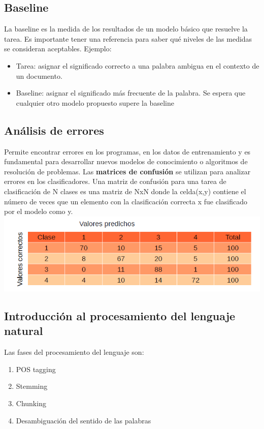 \documentclass{ctexart}
\begin{document}
	\subsection{Baseline}
	\begin{flushleft}
		La baseline es la medida de los resultados de un modelo básico que resuelve la tarea. Es importante tener una referencia para saber qué niveles de las medidas se consideran aceptables.
		Ejemplo:
		\begin{itemize}
			\item Tarea: asignar el significado correcto a una palabra ambigua en el contexto de un documento.
			\item Baseline: asignar el significado más frecuente de la palabra.	Se espera que cualquier otro modelo propuesto supere la baseline
		\end{itemize}
	\end{flushleft}
	\subsection{Análisis de errores}
	\begin{flushleft}
		Permite encontrar errores en los programas, en los datos de entrenamiento y es fundamental para desarrollar nuevos modelos de conocimiento o algoritmos de resolución de problemas.
		Las \textbf{matrices de confusión} se utilizan para analizar errores en los clasificadores. Una matriz de confusión para una tarea de clasificación de N clases es una matriz de NxN
		donde la celda(x,y) contiene el número de veces que un elemento con la clasificación correcta x fue clasificado por el modelo como y.
		\includegraphics[scale=0.75]{errores}
	\end{flushleft}
	\subsection{Introducción al procesamiento del lenguaje natural}
	\begin{flushleft}
	Las fases del procesamiento del lenguaje son:
	\begin{enumerate}
		\begin{enumerate}
			\item Expresiones regulares
			\item Normalización
			\item Distancia de edición
		\end{enumerate}
		\item POS tagging
		\item Stemming
		\item Chunking
		\item Desambiguación del sentido de las palabras
	\end{enumerate}
	\end{flushleft}
\end{document}
